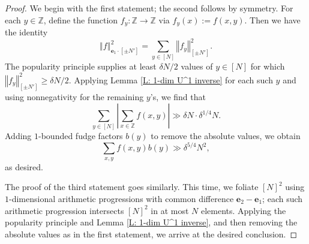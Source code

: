 \documentclass[11pt]{amsart}
\theoremstyle{definition}
\newcommand{\Z}{{\mathbb Z}}
\newcommand{\be}{{\mathbf{e}}}
\newcommand{\norm}[1]{\left\Vert #1\right\Vert}
\newcommand{\abs}[1]{\mathopen{}\left| #1\mathclose{}\right|}
\begin{document}
\begin{proof}
We begin with the first statement; the second follows by symmetry.  For each $y \in \Z$, define the function $f_y:\Z \to \Z$ via $f_y(x):=f(x,y)$.  Then we have the identity
$$\norm{f}_{\be_1\cdot[\pm N']}^2=\sum_{y \in [N]} \norm{f_y}_{[\pm N']}^2.$$
The popularity principle supplies at least $\delta N/2$ values of $y \in [N]$ for which $\norm{f_y}_{[\pm N']}^2 \geq \delta N/2$.  Applying Lemma \ref{L: 1-dim U^1 inverse} for each such $y$ and using nonnegativity for the remaining $y$'s, we find that
$$\sum_{y \in [N]} \abs{\sum_{x \in \Z} f(x,y)} \gg \delta N \cdot \delta^{1/4} N.$$
Adding $1$-bounded fudge factors $b(y)$ to remove the absolute values, we obtain
$$\sum_{x,y} f(x,y)b(y) \gg \delta^{5/4}N^2,$$
as desired.

The proof of the third statement goes similarly.  This time, we foliate $[N]^2$ using $1$-dimensional arithmetic progressions with common difference $\be_2-\be_1$; each such arithmetic progression intersects $[N]^2$ in at most $N$ elements.  Applying the popularity principle and Lemma \ref{L: 1-dim U^1 inverse}, and then removing the absolute values as in the first statement, we arrive at the desired conclusion.
\end{proof}
\end{document}
